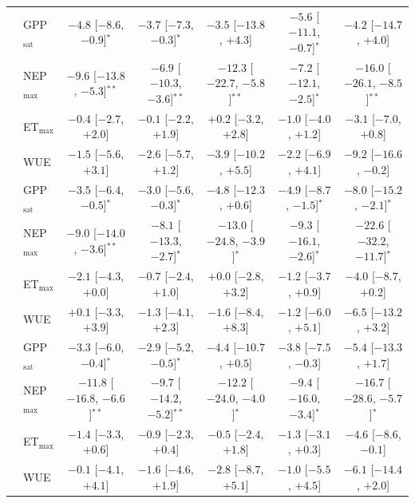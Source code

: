 \begin{table}[htbp]
{\begin{tabular}{llccccc}
\midrule
{} & GPP$_\mathrm{sat}$ & $-4.8$ {\tiny[$-8.6$, $-0.9$]}$^{*}$ & $-3.7$ {\tiny[$-7.3$, $-0.3$]}$^{*}$ & $-3.5$ {\tiny[$-13.8$, $+4.3$]} & $-5.6$ {\tiny[$-11.1$, $-0.7$]}$^{*}$ & $-4.2$ {\tiny[$-14.7$, $+4.0$]} \\
 & NEP$_\mathrm{max}$ & $-9.6$ {\tiny[$-13.8$, $-5.3$]}$^{**}$ & $-6.9$ {\tiny[$-10.3$, $-3.6$]}$^{**}$ & $-12.3$ {\tiny[$-22.7$, $-5.8$]}$^{**}$ & $-7.2$ {\tiny[$-12.1$, $-2.5$]}$^{*}$ & $-16.0$ {\tiny[$-26.1$, $-8.5$]}$^{**}$ \\
 & ET$_\mathrm{max}$ & $-0.4$ {\tiny[$-2.7$, $+2.0$]} & $-0.1$ {\tiny[$-2.2$, $+1.9$]} & $+0.2$ {\tiny[$-3.2$, $+2.8$]} & $-1.0$ {\tiny[$-4.0$, $+1.2$]} & $-3.1$ {\tiny[$-7.0$, $+0.8$]} \\
 & WUE & $-1.5$ {\tiny[$-5.6$, $+3.1$]} & $-2.6$ {\tiny[$-5.7$, $+1.2$]} & $-3.9$ {\tiny[$-10.2$, $+5.5$]} & $-2.2$ {\tiny[$-6.9$, $+4.1$]} & $-9.2$ {\tiny[$-16.6$, $-0.2$]} \\
\midrule
{} & GPP$_\mathrm{sat}$ & $-3.5$ {\tiny[$-6.4$, $-0.5$]}$^{*}$ & $-3.0$ {\tiny[$-5.6$, $-0.3$]}$^{*}$ & $-4.8$ {\tiny[$-12.3$, $+0.6$]} & $-4.9$ {\tiny[$-8.7$, $-1.5$]}$^{*}$ & $-8.0$ {\tiny[$-15.2$, $-2.1$]}$^{*}$ \\
 & NEP$_\mathrm{max}$ & $-9.0$ {\tiny[$-14.0$, $-3.6$]}$^{**}$ & $-8.1$ {\tiny[$-13.3$, $-2.7$]}$^{*}$ & $-13.0$ {\tiny[$-24.8$, $-3.9$]}$^{*}$ & $-9.3$ {\tiny[$-16.1$, $-2.6$]}$^{*}$ & $-22.6$ {\tiny[$-32.2$, $-11.7$]}$^{*}$ \\
 & ET$_\mathrm{max}$ & $-2.1$ {\tiny[$-4.3$, $+0.0$]} & $-0.7$ {\tiny[$-2.4$, $+1.0$]} & $+0.0$ {\tiny[$-2.8$, $+3.2$]} & $-1.2$ {\tiny[$-3.7$, $+0.9$]} & $-4.0$ {\tiny[$-8.7$, $+0.2$]} \\
 & WUE & $+0.1$ {\tiny[$-3.3$, $+3.9$]} & $-1.3$ {\tiny[$-4.1$, $+2.3$]} & $-1.6$ {\tiny[$-8.4$, $+8.3$]} & $-1.2$ {\tiny[$-6.0$, $+5.1$]} & $-6.5$ {\tiny[$-13.2$, $+3.2$]} \\
\midrule
{} & GPP$_\mathrm{sat}$ & $-3.3$ {\tiny[$-6.0$, $-0.4$]}$^{*}$ & $-2.9$ {\tiny[$-5.2$, $-0.5$]}$^{*}$ & $-4.4$ {\tiny[$-10.7$, $+0.5$]} & $-3.8$ {\tiny[$-7.5$, $-0.3$]} & $-5.4$ {\tiny[$-13.3$, $+1.7$]} \\
 & NEP$_\mathrm{max}$ & $-11.8$ {\tiny[$-16.8$, $-6.6$]}$^{**}$ & $-9.7$ {\tiny[$-14.2$, $-5.2$]}$^{**}$ & $-12.2$ {\tiny[$-24.0$, $-4.0$]}$^{*}$ & $-9.4$ {\tiny[$-16.0$, $-3.4$]}$^{*}$ & $-16.7$ {\tiny[$-28.6$, $-5.7$]}$^{*}$ \\
 & ET$_\mathrm{max}$ & $-1.4$ {\tiny[$-3.3$, $+0.6$]} & $-0.9$ {\tiny[$-2.3$, $+0.4$]} & $-0.5$ {\tiny[$-2.4$, $+1.8$]} & $-1.3$ {\tiny[$-3.1$, $+0.3$]} & $-4.6$ {\tiny[$-8.6$, $-0.1$]} \\
 & WUE & $-0.1$ {\tiny[$-4.1$, $+4.1$]} & $-1.6$ {\tiny[$-4.6$, $+1.9$]} & $-2.8$ {\tiny[$-8.7$, $+5.1$]} & $-1.0$ {\tiny[$-5.5$, $+4.5$]} & $-6.1$ {\tiny[$-14.4$, $+2.0$]} \\
\bottomrule
\end{tabular}}
\end{table}
